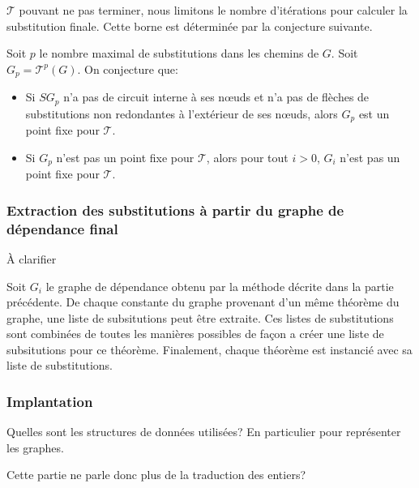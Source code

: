$\mathcal{T}$ pouvant ne pas terminer, nous limitons le nombre
d'itérations pour calculer la substitution finale. Cette borne est
déterminée par la conjecture suivante.

\begin{conjecture}

Soit $p$ le nombre maximal de substitutions dans les chemins de $G$. Soit $G_p = \mathcal{T}^p(G)$. On conjecture que:
\begin{itemize}
\item Si $SG_p$ n'a pas de circuit interne à ses nœuds et n'a pas de flèches de substitutions non redondantes à l'extérieur de ses nœuds, alors $G_p$ est un point fixe pour $\mathcal{T}$.
\item Si $G_p$ n'est pas un point fixe pour $\mathcal{T}$, alors pour tout $i>0$, $G_i$ n'est pas un point fixe pour $\mathcal{T}$.
\end{itemize}
\end{conjecture}

\subsubsection{Extraction des substitutions à partir du graphe de
  dépendance final}

\todo À clarifier

Soit $G_i$ le graphe de dépendance obtenu par la méthode décrite dans la
partie précédente. De chaque constante du graphe provenant d'un m\^eme
théorème du graphe, une liste de subsitutions peut \^etre extraite. Ces
listes de substitutions sont combinées de toutes les manières possibles
de façon a créer une liste de subsitutions pour ce théorème. Finalement,
chaque théorème est instancié avec sa liste de substitutions.


\subsubsection{Implantation}

\todo Quelles sont les structures de données utilisées? En particulier
pour représenter les graphes.


\todo Cette partie ne parle donc plus de la traduction des entiers?



